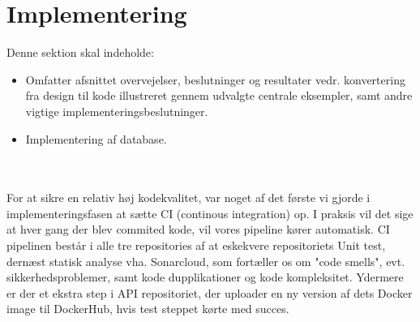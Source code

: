 \section{Implementering}
Denne sektion skal indeholde:

\begin{itemize}
    \item Omfatter afsnittet overvejelser, beslutninger og resultater vedr.  konvertering fra design til kode illustreret gennem udvalgte centrale eksempler, samt andre vigtige implementeringsbeslutninger. 
    \item Implementering af database.
\end{itemize}{}

\\

\\

For at sikre en relativ høj kodekvalitet, var noget af det første vi gjorde i implementeringsfasen at sætte CI (continous integration) op. I praksis vil det sige at hver gang der blev commited kode, vil vores pipeline kører automatisk. CI pipelinen består i alle tre repositories af at eskekvere repositoriets Unit test, dernæst statisk analyse vha. Sonarcloud, som fortæller os om "code smells", evt. sikkerhedsproblemer, samt kode dupplikationer og kode kompleksitet. Ydermere er der et ekstra step i API repositoriet, der uploader en ny version af dets Docker image til DockerHub, hvis test steppet kørte med succes.\\


